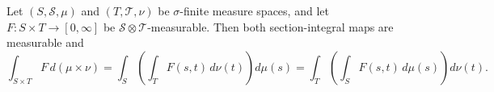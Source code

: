 Let \((S,\mathcal S,\mu)\) and \((T,\mathcal T,\nu)\) be \(\sigma\)-finite measure spaces, and let \(F:S\times T\to[0,\infty]\) be \(\mathcal S\otimes\mathcal T\)-measurable. Then both section-integral maps are measurable and
\[
\int_{S\times T}F\,d(\mu\times\nu)
=\int_S\!\left(\int_TF(s,t)\,d\nu(t)\right)d\mu(s)
=\int_T\!\left(\int_SF(s,t)\,d\mu(s)\right)d\nu(t).
\]
